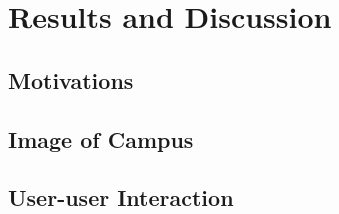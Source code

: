 \chapter{Results and Discussion}\label{ch:6}

\section{Motivations}

\section{Image of Campus}

\section{User-user Interaction}
